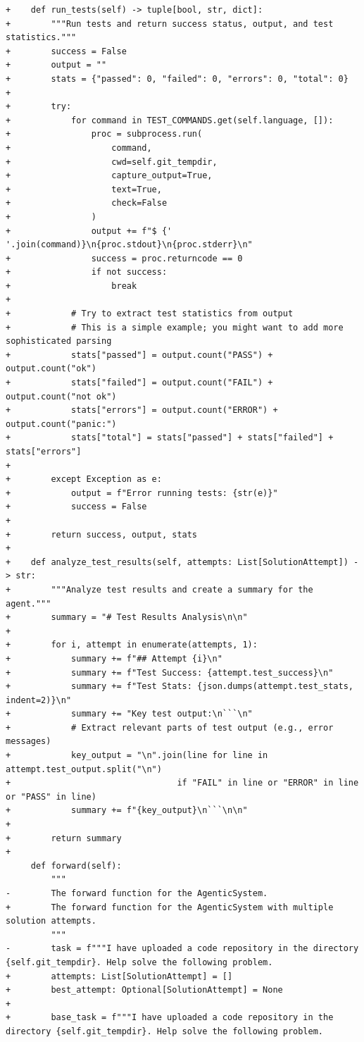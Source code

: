 \documentclass{article} %
\begin{document}
\begin{lstlisting}[style=diffstyle]
+    def run_tests(self) -> tuple[bool, str, dict]:
+        """Run tests and return success status, output, and test statistics."""
+        success = False
+        output = ""
+        stats = {"passed": 0, "failed": 0, "errors": 0, "total": 0}
+
+        try:
+            for command in TEST_COMMANDS.get(self.language, []):
+                proc = subprocess.run(
+                    command, 
+                    cwd=self.git_tempdir,
+                    capture_output=True,
+                    text=True,
+                    check=False
+                )
+                output += f"$ {' '.join(command)}\n{proc.stdout}\n{proc.stderr}\n"
+                success = proc.returncode == 0
+                if not success:
+                    break
+
+            # Try to extract test statistics from output
+            # This is a simple example; you might want to add more sophisticated parsing
+            stats["passed"] = output.count("PASS") + output.count("ok")
+            stats["failed"] = output.count("FAIL") + output.count("not ok")
+            stats["errors"] = output.count("ERROR") + output.count("panic:")
+            stats["total"] = stats["passed"] + stats["failed"] + stats["errors"]
+            
+        except Exception as e:
+            output = f"Error running tests: {str(e)}"
+            success = False
+
+        return success, output, stats
+
+    def analyze_test_results(self, attempts: List[SolutionAttempt]) -> str:
+        """Analyze test results and create a summary for the agent."""
+        summary = "# Test Results Analysis\n\n"
+        
+        for i, attempt in enumerate(attempts, 1):
+            summary += f"## Attempt {i}\n"
+            summary += f"Test Success: {attempt.test_success}\n"
+            summary += f"Test Stats: {json.dumps(attempt.test_stats, indent=2)}\n"
+            summary += "Key test output:\n```\n"
+            # Extract relevant parts of test output (e.g., error messages)
+            key_output = "\n".join(line for line in attempt.test_output.split("\n") 
+                                 if "FAIL" in line or "ERROR" in line or "PASS" in line)
+            summary += f"{key_output}\n```\n\n"
+
+        return summary
+
     def forward(self):
         """
-        The forward function for the AgenticSystem.
+        The forward function for the AgenticSystem with multiple solution attempts.
         """
-        task = f"""I have uploaded a code repository in the directory {self.git_tempdir}. Help solve the following problem.
+        attempts: List[SolutionAttempt] = []
+        best_attempt: Optional[SolutionAttempt] = None
+
+        base_task = f"""I have uploaded a code repository in the directory {self.git_tempdir}. Help solve the following problem.
 

\end{lstlisting}
\end{document}
